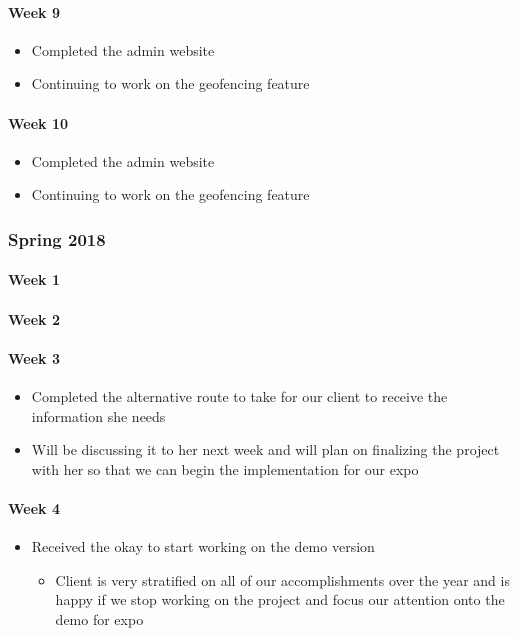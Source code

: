 \documentclass[onecolumn, draftclsnofoot,10pt, compsoc]{IEEEtran}
\begin{document}
      \paragraph{Week 9}
        \begin{itemize}
          \item Completed the admin website
          \item Continuing to work on the geofencing feature
        \end{itemize}

      \paragraph{Week 10}
        \begin{itemize}
          \item Completed the admin website
          \item Continuing to work on the geofencing feature
        \end{itemize}

    \subsubsection{Spring 2018}
      \paragraph{Week 1}
      \paragraph{Week 2}
      \paragraph{Week 3}
        \begin{itemize}
          \item Completed the alternative route to take for our client to receive the information she needs
          \item Will be discussing it to her next week and will plan on finalizing the project with her so that we can begin the implementation for our expo
        \end{itemize}

      \paragraph{Week 4}
        \begin{itemize}
          \item Received the okay to start working on the demo version
            \begin{itemize}
              \item Client is very stratified on all of our accomplishments over the year and is happy if we stop working on the project and focus our attention onto the demo for expo
          \end{itemize}
        \end{itemize}
\end{document}
